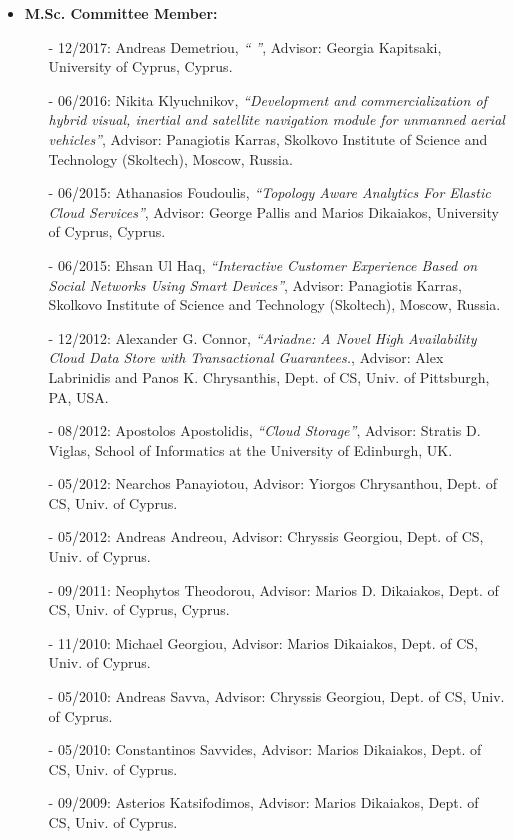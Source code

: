 \documentclass[10pt]{article}
\begin{document}
\begin{itemize}
   \item {\bf M.Sc. Committee Member: }
	\begin{itemize}
		\setlength{\itemsep}{0.10ex}
            \item[-] 12/2017: Andreas Demetriou, {\em `` ''}, Advisor: Georgia Kapitsaki, University of Cyprus, Cyprus.
            \item[-] 06/2016: Nikita Klyuchnikov, {\em ``Development and commercialization of hybrid visual, inertial and satellite navigation module for unmanned aerial vehicles''}, Advisor: Panagiotis Karras, Skolkovo Institute of Science and Technology (Skoltech), Moscow, Russia.
            \item[-] 06/2015: Athanasios Foudoulis, {\em ``Topology Aware Analytics For Elastic Cloud Services''}, Advisor: George Pallis and Marios Dikaiakos, University of Cyprus, Cyprus.
            \item[-] 06/2015: Ehsan Ul Haq, {\em ``Interactive Customer Experience Based on Social Networks Using Smart Devices''}, Advisor: Panagiotis Karras, Skolkovo Institute of Science and Technology (Skoltech), Moscow, Russia.
            \item[-] 12/2012: Alexander G. Connor, {\em ``Ariadne: A Novel High Availability Cloud Data Store with Transactional Guarantees.}, Advisor: Alex Labrinidis and Panos K. Chrysanthis, Dept. of CS, Univ. of Pittsburgh, PA, USA.
            \item[-] 08/2012: Apostolos Apostolidis, {\em ``Cloud Storage''}, Advisor: Stratis D. Viglas,  School of Informatics at the University of Edinburgh, UK.
            \item[-] 05/2012: Nearchos Panayiotou, Advisor: Yiorgos Chrysanthou, Dept. of CS, Univ. of Cyprus.
            \item[-] 05/2012: Andreas Andreou, Advisor: Chryssis Georgiou, Dept. of CS, Univ. of Cyprus.
            \item[-] 09/2011: Neophytos Theodorou, Advisor: Marios D. Dikaiakos, Dept. of CS, Univ. of Cyprus, Cyprus.
            \item[-] 11/2010: Michael Georgiou, Advisor: Marios Dikaiakos, Dept. of CS, Univ. of Cyprus.
			\item[-] 05/2010: Andreas Savva, Advisor: Chryssis Georgiou, Dept. of CS, Univ. of Cyprus.
			\item[-] 05/2010: Constantinos Savvides, Advisor: Marios Dikaiakos, Dept. of CS, Univ. of Cyprus.
			\item[-] 09/2009: Asterios Katsifodimos, Advisor: Marios Dikaiakos, Dept. of CS, Univ. of Cyprus.

\end{itemize}
\end{itemize}
\end{document}
